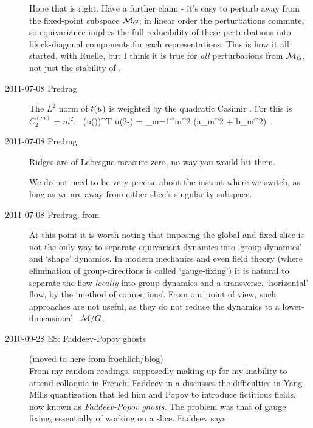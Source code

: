 \begin{description}
Hope that is right. Have a further claim - it's easy to perturb away from
the fixed-point subspace ${\cal M}_{G}$; in linear order the perturbations
commute, so equivariance implies the full reducibility of these
perturbations into block-diagonal components for each representations.
This is how it all started, with Ruelle, but I think it is true
for \emph{all} perturbations from  ${\cal M}_{G}$, not just the stability
of \eqva.

\item[2011-07-08 Predrag]
The $L^2$ norm of $t(u)$ is weighted by
the quadratic Casimir . For  this is
$C_2^{(m)} = m^2$,
\beq
\oint {}
     \, (\Lg u(\gSpace))^T \Lg u(2\pi-\gSpace)
= \sum_{m=1}^\infty m^2 \left(a_m^2 + b_m^2\right)
\,.


\item[2011-07-08 Predrag]
Ridges are of Lebesgue measure zero, no way you would hit them.

We do not need to be very precise about the instant
where we switch, as long as we are away from either slice's singularity
subspace.


\item[2011-07-08 Predrag, from \refref{FrCv11}]                     \toCB
At this point it is worth noting that imposing the global and fixed slice
is not the only way to separate equivariant dynamics into `group
dynamics' and `shape' dynamics. In modern mechanics and even
field theory (where elimination of group-directions is called
`gauge-fixing') it is natural to separate the flow {\em locally} into
group dynamics and a transverse, `horizontal'
flow, by the `method of
connections'. From our point of view, such
approaches are not useful, as they do not reduce the dynamics to a
lower-dimensional \reducedsp\ ${\cal M}/G$.

\item[2010-09-28 ES: Faddeev-Popov ghosts]                    \toCB
(moved to here from froehlich/blog)
\\
From my random readings, supposedly making up for my inability to attend
colloquia in French: Faddeev in a
 discusses the difficulties in Yang-Mills quantization that led
him and Popov to introduce fictitious fields, now known as
\emph{Faddeev-Popov ghosts}. The problem was that of gauge fixing,
essentially of working on a slice. Faddeev says:


\end{description}
